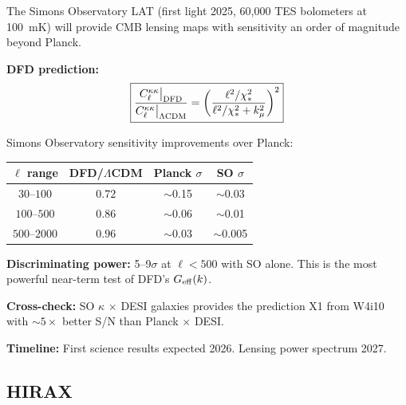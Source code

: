 \documentclass[11pt,a4paper]{article}
\begin{document}
\begin{newbox}

The Simons Observatory LAT (first light 2025, 60,000 TES bolometers
at 100~mK) will provide CMB lensing maps with sensitivity an order of
magnitude beyond Planck.

\textbf{DFD prediction:}
\begin{equation}
\boxed{
\frac{C_\ell^{\kappa\kappa}\big|_{\rm DFD}}{C_\ell^{\kappa\kappa}
\big|_{\Lambda\rm CDM}} = \left(\frac{\ell^2/\chi_*^2}
{\ell^2/\chi_*^2 + k_\mu^2}\right)^2
}
\end{equation}

Simons Observatory sensitivity improvements over Planck:
\begin{center}
\begin{tabular}{cccc}
\toprule
$\ell$ range & DFD/$\Lambda$CDM & Planck $\sigma$ &
SO $\sigma$ \\
\midrule
$30$--$100$ & $0.72$ & $\sim$0.15 & $\sim$0.03 \\
$100$--$500$ & $0.86$ & $\sim$0.06 & $\sim$0.01 \\
$500$--$2000$ & $0.96$ & $\sim$0.03 & $\sim$0.005 \\
\bottomrule
\end{tabular}
\end{center}

\textbf{Discriminating power:} 5--9$\sigma$ at $\ell < 500$ with
SO alone. This is the most powerful near-term test of DFD's
$G_{\rm eff}(k)$.

\textbf{Cross-check:} SO $\kappa$ $\times$ DESI galaxies provides
the prediction X1 from W4i10 with $\sim 5\times$ better S/N than
Planck $\times$ DESI.

\textbf{Timeline:} First science results expected 2026. Lensing
power spectrum 2027.
\end{newbox}

\subsection{HIRAX}
\end{document}
